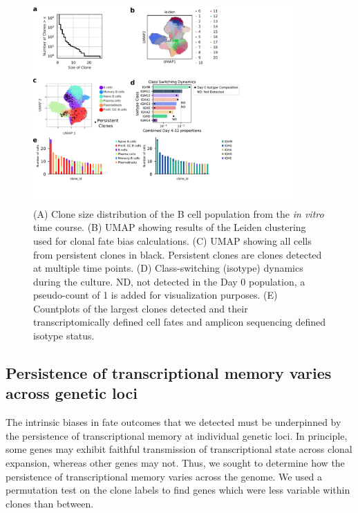 \begin{figure}[hbt!]
\centering
\includegraphics[width=10cm, keepaspectratio]{figs/InVitro/figS3_bcd.pdf}
\caption[Clonal analysis of cell identity outcomes.]{(A) Clone size distribution of the B cell population from the \textit{in vitro} time course. (B) UMAP showing results of the Leiden clustering used for clonal fate bias calculations. (C) UMAP showing all cells from persistent clones in black. Persistent clones are clones detected at multiple time points. (D) Class-switching (isotype) dynamics during the culture. ND, not detected in the Day 0 population, a pseudo-count of 1 is added for visualization purposes. (E) Countplots of the largest clones detected and their transcriptomically defined cell fates and amplicon sequencing defined isotype status.}
\label{fig:paper2_fig_s3}
\end{figure}


\subsection{Persistence of transcriptional memory varies across genetic loci}
The intrinsic biases in fate outcomes that we detected must be underpinned by the persistence of transcriptional memory at individual genetic loci. In principle, some genes may exhibit faithful transmission of transcriptional state across clonal expansion, whereas other genes may not. Thus, we sought to determine how the persistence of transcriptional memory varies across the genome. We used a permutation test on the clone labels to find genes which were less variable within clones than between.

